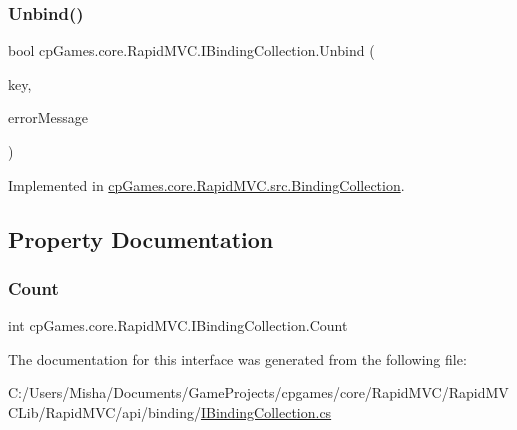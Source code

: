 \subsubsection{\texorpdfstring{Unbind()}{Unbind()}}
{\footnotesize\ttfamily bool cp\+Games.\+core.\+Rapid\+M\+V\+C.\+I\+Binding\+Collection.\+Unbind (\begin{DoxyParamCaption}\item[{\mbox{\hyperlink{interfacecp_games_1_1core_1_1_rapid_m_v_c_1_1_i_binding_key}{I\+Binding\+Key}}}]{key,  }\item[{out string}]{error\+Message }\end{DoxyParamCaption})}



Implemented in \mbox{\hyperlink{classcp_games_1_1core_1_1_rapid_m_v_c_1_1src_1_1_binding_collection_a09aab47e05fb2aac72f9dbcb4797a6c2}{cp\+Games.\+core.\+Rapid\+M\+V\+C.\+src.\+Binding\+Collection}}.



\subsection{Property Documentation}
\mbox{\label{interfacecp_games_1_1core_1_1_rapid_m_v_c_1_1_i_binding_collection_a9365956363826896a1a7caaeb494d0a1}} 
\subsubsection{\texorpdfstring{Count}{Count}}
{\footnotesize\ttfamily int cp\+Games.\+core.\+Rapid\+M\+V\+C.\+I\+Binding\+Collection.\+Count\hspace{0.3cm}{\ttfamily [get]}}



The documentation for this interface was generated from the following file\+:\begin{DoxyCompactItemize}
\item 
C\+:/\+Users/\+Misha/\+Documents/\+Game\+Projects/cpgames/core/\+Rapid\+M\+V\+C/\+Rapid\+M\+V\+C\+Lib/\+Rapid\+M\+V\+C/api/binding/\mbox{\hyperlink{_i_binding_collection_8cs}{I\+Binding\+Collection.\+cs}}\end{DoxyCompactItemize}
